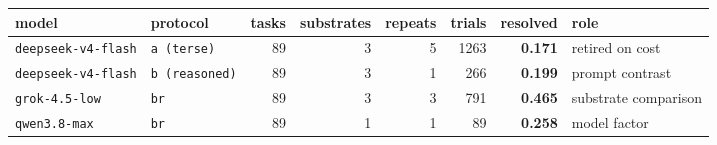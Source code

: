 \begin{tabular}{llrrrrrl}
\toprule
model & protocol & tasks & substrates & repeats & trials & resolved & role \\
\midrule
\texttt{deepseek-v4-flash} & \texttt{a (terse)} & 89 & 3 & 5 & 1263 & \textbf{0.171} & retired on cost \\
\texttt{deepseek-v4-flash} & \texttt{b (reasoned)} & 89 & 3 & 1 & 266 & \textbf{0.199} & prompt contrast \\
\texttt{grok-4.5-low} & \texttt{br} & 89 & 3 & 3 & 791 & \textbf{0.465} & substrate comparison \\
\texttt{qwen3.8-max} & \texttt{br} & 89 & 1 & 1 & 89 & \textbf{0.258} & model factor \\
\bottomrule
\end{tabular}
